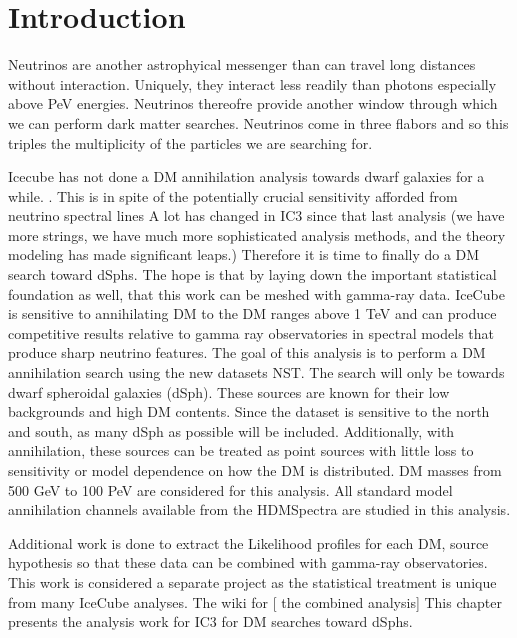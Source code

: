 \section{Introduction} \label{sec:icDM_intro}

Neutrinos are another astrophyical messenger than can travel long distances without interaction.
Uniquely, they interact less readily than photons especially above PeV energies.
Neutrinos thereofre provide another window through which we can perform dark matter searches.
Neutrinos come in three flabors and so this triples the multiplicity of the particles we are searching for.

Icecube has not done a DM annihilation analysis towards dwarf galaxies for a while. .
This is in spite of the potentially crucial sensitivity afforded from neutrino spectral lines 
A lot has changed in IC3 since that last analysis (we have more strings, we have much more sophisticated analysis methods, and the theory modeling has made significant leaps.)
Therefore it is time to finally do a DM search toward dSphs.
The hope is that by laying down the important statistical foundation as well, that this work can be meshed with gamma-ray data.
IceCube is sensitive to annihilating DM to the DM ranges above 1 TeV and can produce competitive results relative to gamma ray observatories in spectral models that produce sharp neutrino features.
The goal of this analysis is to perform a DM annihilation search using the new datasets NST.
The search will only be towards dwarf spheroidal galaxies (dSph).
These sources are known for their low backgrounds and high DM contents.
Since the dataset is sensitive to the north and south, as many dSph as possible will be included.
Additionally, with annihilation, these sources can be treated as point sources with little loss to sensitivity or model dependence on how the DM is distributed.
DM masses from 500 GeV to 100 PeV are considered for this analysis.
All standard model annihilation channels available from the HDMSpectra are studied in this analysis.

Additional work is done to extract the Likelihood profiles for each DM, source hypothesis so that these data can be combined with gamma-ray observatories.
This work is considered a separate project as the statistical treatment is unique from many IceCube analyses.
The wiki for [ the combined analysis] 
This chapter presents the analysis work for IC3 for DM searches toward dSphs.

